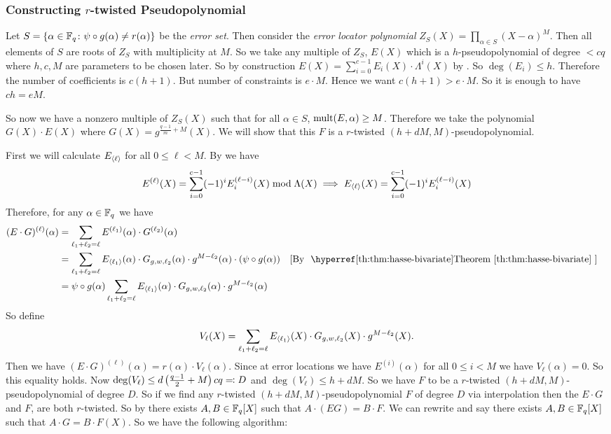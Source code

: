 \subsubsection{Constructing \texorpdfstring{$r$}{r}-twisted Pseudopolynomial}
Let $S=\{\alpha\in\mathbb{F}_q\colon \psi\circ g(\alpha)\neq r(\alpha)\}$ be the \emph{error set}. Then consider the \emph{error locator polynomial} $Z_S(X)=\prod_{\alpha\in S}(X-\alpha)^M$. Then all elements of $S$ are roots of $Z_S$ with multiplicity at $M$. So we take any multiple of $Z_S$, $E(X)$ which is a $h$-pseudopolynomial of degree $<cq$ where $h,c,M$ are parameters to be chosen later. So by construction $E(X)=\sum_{i=0}^{c-1}E_i(X)\cdot \Lambda^i(X)$ by \PdegCharlem. So $\deg(E_i)\leq h$. Therefore the number of coefficients is $c(h+1)$. But number of constraints is $e\cdot M$. Hence we want $c(h+1)>e\cdot M$. So it is enough to have $ch=eM$.

So now we have a nonzero multiple of $Z_S(X)$ such that for all $\alpha\in S$, $\operatorname{mult}(E,\alpha)\geq M$. Therefore we take the polynomial $G(X)\cdot E(X)$ where $G(X)=g^{\frac{q-1}m+M}(X)$. We will show that this $F$ is a $r$-twisted $(h+dM,M)$-pseudopolynomial.

First we will calculate $E_{\langle \ell\rangle}$ for all $0\leq \ell<M$. By \DerivativeXqXlem we have $$E^{(\ell)}(X)=\sum_{i=0}^{c-1}(-1)^iE_i^{(\ell -i)}(X)\bmod{\Lambda(X)}\implies E_{\langle \ell\rangle}(X)=\sum_{i=0}^{c-1}(-1)^iE_i^{(\ell -i)}(X)$$Therefore, for any $\alpha\in\mathbb{F}_q$ we have \begin{align*}
  (E\cdot G)^{(\ell)}(\alpha) & = \sum_{\ell_1+\ell_2=\ell}E^{(\ell_1)}(\alpha)\cdot G^{(\ell_2)}(\alpha)                                                                   \\
                              & = \sum_{\ell_1+\ell_2=\ell}E_{\la \ell_1\ra}(\alpha)\cdot G_{g,w,\ell_2}(\alpha)\cdot g^{M-\ell_2}(\alpha)\cdot \lt(\psi\circ g(\alpha)\rt) & \by{\HasseBivariatethm}\\
                              & = \psi\circ g(\alpha) \sum_{\ell_1+\ell_2=\ell}E_{\la \ell_1\ra}(\alpha)\cdot G_{g,w,\ell_2}(\alpha)\cdot g^{M-\ell_2}(\alpha)
\end{align*}
So define $$V_{\ell}(X)= \sum_{\ell_1+\ell_2=\ell}E_{\langle \ell_1\rangle}(X)\cdot G_{g,w,\ell_2}(X)\cdot g^{M-\ell_2}(X).$$ Then we have $(E\cdot G)^{(\ell)}(\alpha)=r(\alpha)\cdot V_{\ell}(\alpha)$. Since at error locations we have $E^{(i)}(\alpha)$ for all $0\leq i <M$ we have $V_{\ell}(\alpha)=0$. So this equality holds. Now $\deg(V_{\ell})\leq d\left(\frac{q-1}2+M\right)cq\eqqcolon D$ and $\deg(V_{\ell})\leq h+dM$. So we have $F$ to be a $r$-twisted  $(h+dM,M)$-pseudopolynomial of degree $D$. So if we find any $r$-twisted  $(h+dM,M)$-pseudopolynomial $F$ of degree $D$ via interpolation then the $E\cdot G$ and $F$, are both $r$-twisted. So by \TwistedTwolem there exists $A,B\in\mathbb{F}_q[X]$ such that $A\cdot (EG)=B\cdot F$. We can rewrite and say there exists $A,B\in\mathbb{F}_q[X]$ such that $A\cdot G=B\cdot F(X)$. So we have the following algorithm:

